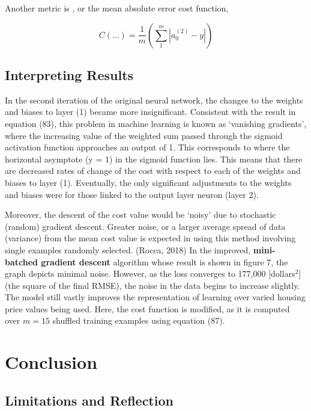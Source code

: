 \documentclass[12pt,a4paper]{article}
\begin{document}
Another metric is , or the mean absolute error cost function,

\begin{equation}
    C(...) = \frac{1}{m} \left(\sum_1^m{\left\lvert{a_0^{(2)}-y}\right\lvert} \right)
\end{equation}




\subsection{Interpreting Results}

In the second iteration of the original neural network, the changes to the weights and biases to layer (1) became more insignificant. Consistent with the result in equation (83), this problem in machine learning is known as ‘vanishing gradients’, where the increasing value of the weighted sum passed through the sigmoid activation function approaches an output of 1. This corresponds to where the horizontal asymptote (y = 1) in the sigmoid function lies. This means that there are decreased rates of change of the cost with respect to each of the weights and biases to layer (1). Eventually, the only significant adjustments to the weights and biases were for those linked to the output layer neuron (layer 2). 

Moreover, the descent of the cost value would be ‘noisy’ due to stochastic (random) gradient descent. Greater noise, or a larger average spread of data (variance) from the mean cost value is expected in using this method involving single examples randomly selected. (Rocca, 2018) In the improved, \textbf{mini-batched gradient descent} algorithm whose result is shown in figure 7, the graph depicts minimal noise. However, as the loss converges to 177,000 [dollars$^2$] (the square of the final RMSE), the noise in the data begins to increase slightly. The model still vastly improves the representation of learning over varied housing price values being used. Here, the cost function is modified, as it is computed over $m=15$ shuffled training examples using equation (87).


\section{Conclusion}

\subsection{Limitations and Reflection}
\end{document}
